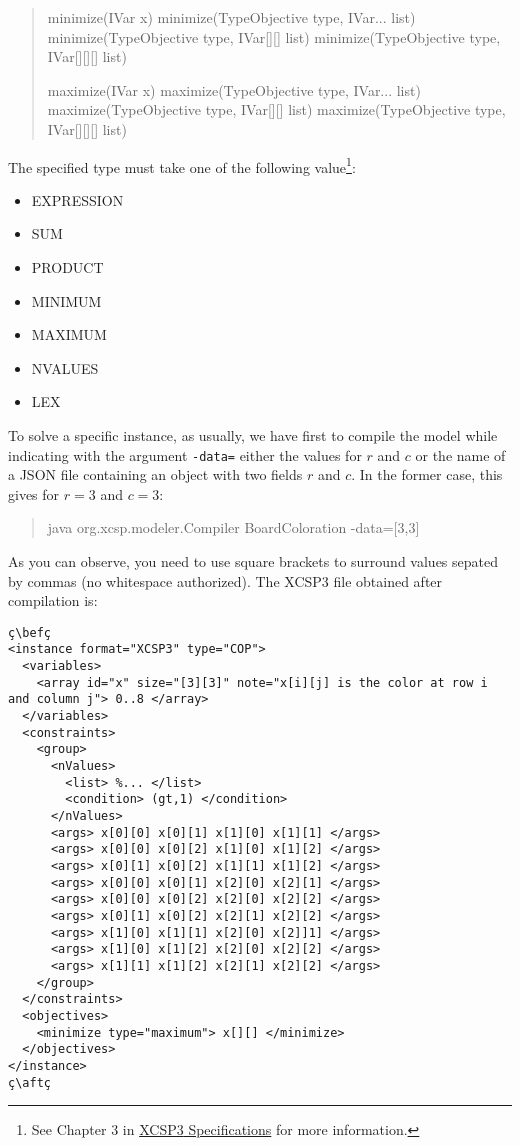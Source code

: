 \documentclass[10pt]{article}
\def\xt{{\rm XCSP3}\xspace}
\def\xt{{\rm XCSP3}\xspace}
\newenvironment{myvb}{\endgraf\small\verbatim}{\endverbatim}
\def\bef{\rule{10cm}{0.1mm}} %
\def\aft{\rule{10cm}{0.1mm}\medskip}
\begin{document}
\begin{quote}
\begin{myvb}
minimize(IVar x) 
minimize(TypeObjective type, IVar... list) 
minimize(TypeObjective type, IVar[][] list) 
minimize(TypeObjective type, IVar[][][] list) 

maximize(IVar x) 
maximize(TypeObjective type, IVar... list) 
maximize(TypeObjective type, IVar[][] list) 
maximize(TypeObjective type, IVar[][][] list) 
\end{myvb}
\end{quote}

The specified type must take one of the following value\footnote{See Chapter 3 in \href{http://www.xcsp.org/format3.pdf}{\xt Specifications} for more information.}:
\begin{itemize}
\item EXPRESSION
\item SUM
\item PRODUCT
\item MINIMUM
\item MAXIMUM
\item NVALUES
\item LEX
\end{itemize}


\bigskip
To solve a specific instance, as usually, we have first to compile the model while indicating with the argument \verb!-data=! either the values for $r$ and $c$ or the name of a JSON file containing an object with two fields $r$ and $c$.
In the former case, this gives for $r=3$ and $c=3$: 
\begin{quote}
\begin{myvb}
java org.xcsp.modeler.Compiler BoardColoration -data=[3,3]
\end{myvb}
\end{quote}

As you can observe, you need to use square brackets to surround values sepated by commas (no whitespace authorized).
The \xt file obtained after compilation is:

\begin{lstlisting}
ç\befç
<instance format="XCSP3" type="COP">
  <variables>
    <array id="x" size="[3][3]" note="x[i][j] is the color at row i and column j"> 0..8 </array>
  </variables>
  <constraints>
    <group>
      <nValues>
        <list> %... </list>
        <condition> (gt,1) </condition>
      </nValues>
      <args> x[0][0] x[0][1] x[1][0] x[1][1] </args>
      <args> x[0][0] x[0][2] x[1][0] x[1][2] </args>
      <args> x[0][1] x[0][2] x[1][1] x[1][2] </args>
      <args> x[0][0] x[0][1] x[2][0] x[2][1] </args>
      <args> x[0][0] x[0][2] x[2][0] x[2][2] </args>
      <args> x[0][1] x[0][2] x[2][1] x[2][2] </args>
      <args> x[1][0] x[1][1] x[2][0] x[2]]1] </args>
      <args> x[1][0] x[1][2] x[2][0] x[2][2] </args>
      <args> x[1][1] x[1][2] x[2][1] x[2][2] </args>
    </group>
  </constraints>
  <objectives>
    <minimize type="maximum"> x[][] </minimize>
  </objectives>
</instance>
ç\aftç
\end{lstlisting}
\end{document}

